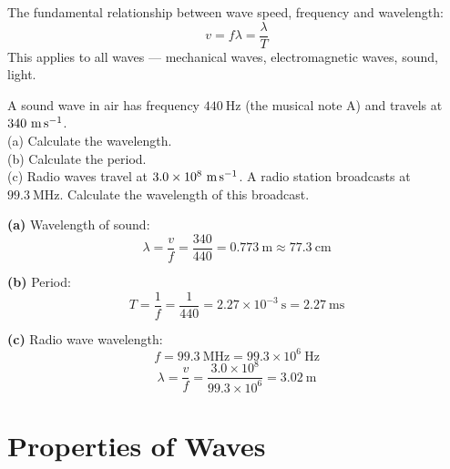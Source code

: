 \begin{diagbox}
\begin{center}
\end{center}
\end{diagbox}

\begin{lawbox}
The fundamental relationship between wave speed,
frequency and wavelength:
\[
  v = f\lambda = \frac{\lambda}{T}
\]
This applies to all waves --- mechanical waves,
electromagnetic waves, sound, light.
\end{lawbox}

\begin{examplebox}[17.1]
A sound wave in air has frequency $440\ \text{Hz}$
(the musical note A) and travels at
$340\ \text{m\,s}^{-1}$.\\
(a) Calculate the wavelength.\\
(b) Calculate the period.\\
(c) Radio waves travel at $3.0\times10^8\ \text{m\,s}^{-1}$.
A radio station broadcasts at $99.3\ \text{MHz}$.
Calculate the wavelength of this broadcast.
\end{examplebox}

\begin{solutionbox}
\textbf{(a)} Wavelength of sound:
\[
  \lambda = \frac{v}{f}
  = \frac{340}{440}
  = 0.773\ \text{m} \approx 77.3\ \text{cm}
\]

\textbf{(b)} Period:
\[
  T = \frac{1}{f} = \frac{1}{440}
  = 2.27\times10^{-3}\ \text{s} = 2.27\ \text{ms}
\]

\textbf{(c)} Radio wave wavelength:
\[
  f = 99.3\ \text{MHz} = 99.3\times10^6\ \text{Hz}
\]
\[
  \lambda = \frac{v}{f}
  = \frac{3.0\times10^8}{99.3\times10^6}
  = 3.02\ \text{m}
\]
\end{solutionbox}

\section{Properties of Waves}

